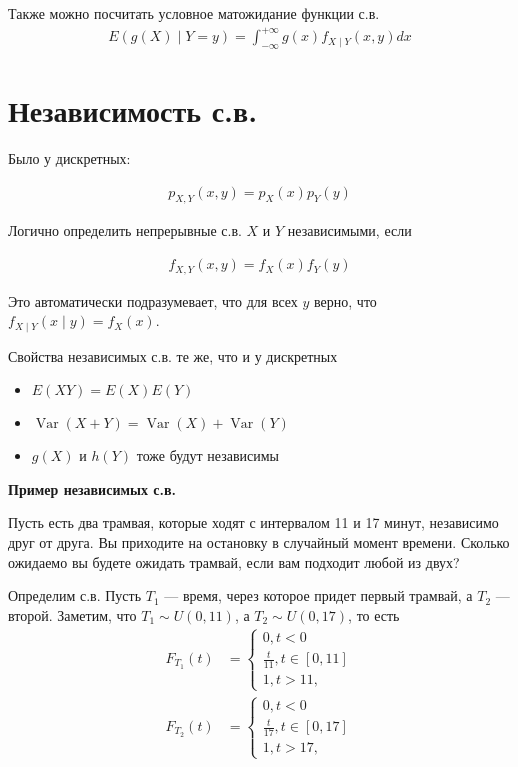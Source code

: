 \documentclass[12pt]{article}
\DeclareMathOperator{\Var}{Var}
\begin{document}
Также можно посчитать условное матожидание функции с.в.
\begin{align*}
  E(g(X) \mid Y = y) = \int_{-\infty}^{+\infty} g(x) f_{X \mid Y}(x, y) dx
\end{align*}

\section{Независимость с.в.}

Было у дискретных:

\begin{align*}
  p_{X, Y}(x, y) = p_X(x)p_Y(y)
\end{align*}

Логично определить непрерывные с.в. $X$ и $Y$ независимыми, если

\begin{align*}
  f_{X, Y}(x, y) = f_X(x) f_Y(y)
\end{align*}

Это автоматически подразумевает, что для всех $y$ верно, что $f_{X \mid Y}(x \mid y) = f_X(x)$.

Свойства независимых с.в. те же, что и у дискретных
\begin{itemize}
  \item $E(XY) = E(X) E(Y)$
  \item $\Var(X + Y) = \Var(X) + \Var(Y)$
  \item $g(X)$ и $h(Y)$ тоже будут независимы  
\end{itemize}

\textbf{Пример независимых с.в.}

Пусть есть два трамвая, которые ходят с интервалом 11 и 17 минут, независимо друг от друга. Вы приходите на остановку в случайный момент времени. Сколько ожидаемо вы будете ожидать трамвай, если вам подходит любой из двух?

Определим с.в. Пусть $T_1$ --- время, через которое придет первый трамвай, а $T_2$ --- второй. Заметим, что $T_1 \sim U(0, 11)$, а $T_2 \sim U(0, 17)$, то есть
\begin{align*}
  F_{T_1}(t) &= \begin{cases}
    0, t < 0 \\
    \frac{t}{11}, t \in [0, 11] \\
    1, t > 11,
  \end{cases} \\
  F_{T_2}(t) &= \begin{cases}
    0, t < 0 \\
    \frac{t}{17}, t \in [0, 17] \\
    1, t > 17,
  \end{cases}
\end{align*}
\end{document}
